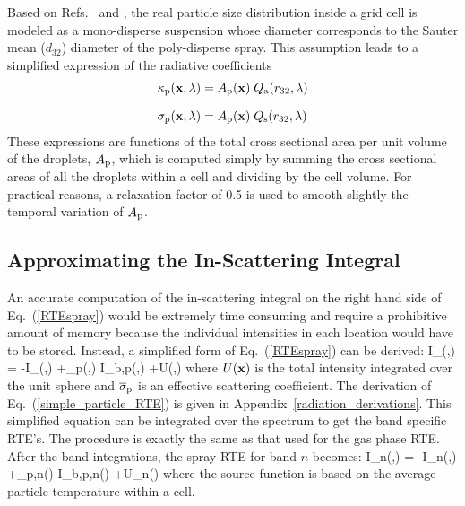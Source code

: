 Based on Refs.~\cite{Collin} and \cite{Maruyama}, the real particle size distribution inside a grid cell is modeled as a mono-disperse suspension whose diameter corresponds to the Sauter mean ($d_{32}$) diameter of the poly-disperse spray. This assumption leads to a simplified expression of the radiative coefficients
\begin{align}
\kappa_{\rm p}({\mathbf{x}},\lambda) &= A_{\rm p}({\mathbf{x}}) \; Q_{\rm a}(r_{32},\lambda) \\[0.1in]
\sigma_{\rm p}({\mathbf{x}},\lambda) &= A_{\rm p}({\mathbf{x}}) \; Q_{\rm s}(r_{32},\lambda)
\end{align}
These expressions are functions of the total cross sectional area per unit volume of the droplets, $A_{\rm p}$, which is computed simply by summing the cross sectional areas of all the droplets within a cell and dividing by the cell volume. For practical reasons, a relaxation factor of 0.5 is used to smooth slightly the temporal variation of $A_{\rm p}$.

\subsection{Approximating the In-Scattering Integral}

An accurate computation of the in-scattering integral on the right hand side of Eq.~(\ref{RTEspray}) would be extremely time consuming and require a prohibitive amount of memory because the individual intensities in each location would have to be stored. Instead, a simplified form of Eq.~(\ref{RTEspray}) can be derived:
\be
\bs \cdot \nabla I_{\la}(\bx,\bs) =
-
I_{\la}(\bx,\bs)
+\kappa_{\rm p}(\bx,\la) \; I_{\rm b,p}(\bx,\la)
+U(\bx,\la) \label{simple_particle_RTE}
\ee
where $U({\mathbf{x}})$ is the total intensity integrated over the unit sphere and $\overline{\sigma}_{\rm p}$ is an effective scattering coefficient. The derivation of Eq.~(\ref{simple_particle_RTE}) is given in Appendix~\ref{radiation_derivations}. This simplified equation can be integrated over the spectrum to get the band specific RTE's. The procedure is exactly the same as that used for the gas phase RTE. After the band integrations, the spray RTE for band $n$ becomes:
\be
\bs \cdot \nabla I_{n}(\bx,\bs) =
- I_n(\bx,\bs)
+\kappa_{{\rm p},n}(\bx) \; I_{{\rm b,p},n}(\bx)
+U_n(\bx)
\ee
where the source function is based on the average particle temperature within a cell.


